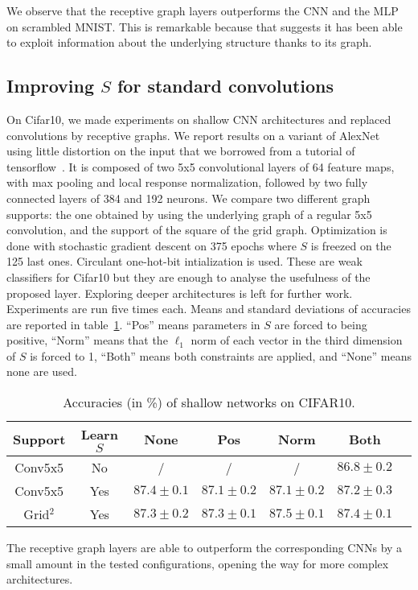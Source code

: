 We observe that the receptive graph layers outperforms the CNN and the MLP on scrambled MNIST. This is remarkable because that suggests it has been able to exploit information about the underlying structure thanks to its graph.

\subsection{Improving $S$ for standard convolutions}

On Cifar10, we made experiments on shallow CNN architectures and replaced convolutions by receptive graphs. We report results on a variant of AlexNet~\cite{krizhevsky2012imagenet} using little distortion on the input that we borrowed from a tutorial of tensorflow~\cite{tensorflow2015-whitepaper}.
It is composed of two 5x5 convolutional layers of 64 feature maps, with max pooling and local response normalization, followed by two fully connected layers of 384 and 192 neurons.
We compare two different graph supports: the one obtained by using the underlying graph of a regular 5x5 convolution, and the support of the square of the grid graph. Optimization is done with stochastic gradient descent on 375 epochs where $S$ is freezed on the 125 last ones. Circulant one-hot-bit intialization is used. These are weak classifiers for Cifar10 but they are enough to analyse the usefulness of the proposed layer. Exploring deeper architectures is left for further work. Experiments are run five times each. Means and standard deviations of accuracies are reported in table~\ref{cifar}. ``Pos'' means parameters in $S$ are forced to being positive, ``Norm'' means that the $\ell_1$ norm of each vector in the third dimension of $S$ is forced to 1, ``Both'' means both constraints are applied, and ``None'' means none are used.

\begin{table}[H]
  \caption{Accuracies (in \%) of shallow networks on CIFAR10.}
  \begin{center}
    \bgroup
    \def\arraystretch{1.5}%
    \begin{tabular}{|c|c|c|c|c|c|c|}
      \hline
      Support & Learn $S$ & None & Pos & Norm & Both\\
      \hline
      \hline
      Conv5x5 & No & / & / & / & $86.8 \pm 0.2$\\
      \hline
      Conv5x5 & Yes & $87.4 \pm 0.1$ & $87.1 \pm 0.2$ & $87.1 \pm 0.2$ & $87.2 \pm 0.3$\\
      \hline
      Grid$^2$ & Yes & $87.3 \pm 0.2$ & $87.3 \pm 0.1$ & $87.5 \pm 0.1$ & $87.4 \pm 0.1$\\
      \hline
    \end{tabular}
    \egroup
  \end{center}
  \label{cifar}
\end{table}

The receptive graph layers are able to outperform the corresponding CNNs by a small amount in the tested configurations, opening the way for more complex architectures.


